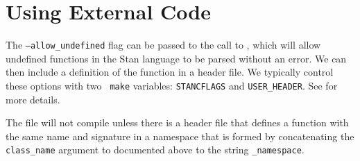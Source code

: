 \section{Using External \Cpp Code}

The {\tt --allow\_undefined} flag can be passed to the call to \stanc,
which will allow undefined functions in the Stan language to be parsed
without an error. We can then include a definition of the function in
a \Cpp header file. We typically control these options with two {\tt
  make} variables: \Verb|STANCFLAGS| and \Verb|USER_HEADER|. See
 for more details.

The \Cpp file will not compile unless there is a header file that
defines a function with the same name and signature in a namespace
that is formed by concatenating the {\tt class\_name} argument to
\stanc documented above to the string {\tt \_namespace}.

